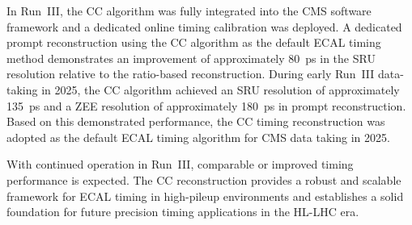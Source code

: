 In Run~III, the CC algorithm was fully integrated into the CMS software framework and a dedicated online timing calibration was deployed.
A dedicated prompt reconstruction using the CC algorithm as the default ECAL timing method demonstrates an improvement of approximately 80~ps in the SRU resolution relative to the ratio-based reconstruction.
During early Run~III data-taking in 2025, the CC algorithm achieved an SRU resolution of approximately 135~ps and a ZEE resolution of approximately 180~ps in prompt reconstruction.
Based on this demonstrated performance, the CC timing reconstruction was adopted as the default ECAL timing algorithm for CMS data taking in 2025.

With continued operation in Run~III, comparable or improved timing performance is expected.
The CC reconstruction provides a robust and scalable framework for ECAL timing in high-pileup environments and establishes a solid foundation for future precision timing applications in the HL-LHC era.
